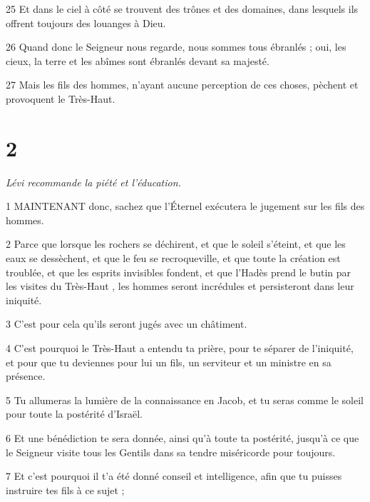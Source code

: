 \par 25 Et dans le ciel à côté se trouvent des trônes et des domaines, dans lesquels ils offrent toujours des louanges à Dieu.

\par 26 Quand donc le Seigneur nous regarde, nous sommes tous ébranlés ; oui, les cieux, la terre et les abîmes sont ébranlés devant sa majesté.

\par 27 Mais les fils des hommes, n'ayant aucune perception de ces choses, pèchent et provoquent le Très-Haut.

\chapter{2}

\par \textit{Lévi recommande la piété et l'éducation.}

\par 1 MAINTENANT donc, sachez que l'Éternel exécutera le jugement sur les fils des hommes.

\par 2 Parce que lorsque les rochers se déchirent, et que le soleil s'éteint, et que les eaux se dessèchent, et que le feu se recroqueville, et que toute la création est troublée, et que les esprits invisibles fondent, et que l'Hadès prend le butin par les visites du Très-Haut , les hommes seront incrédules et persisteront dans leur iniquité.

\par 3 C'est pour cela qu'ils seront jugés avec un châtiment.

\par 4 C'est pourquoi le Très-Haut a entendu ta prière, pour te séparer de l'iniquité, et pour que tu deviennes pour lui un fils, un serviteur et un ministre en sa présence.

\par 5 Tu allumeras la lumière de la connaissance en Jacob, et tu seras comme le soleil pour toute la postérité d'Israël.

\par 6 Et une bénédiction te sera donnée, ainsi qu'à toute ta postérité, jusqu'à ce que le Seigneur visite tous les Gentils dans sa tendre miséricorde pour toujours.

\par 7 Et c'est pourquoi il t'a été donné conseil et intelligence, afin que tu puisses instruire tes fils à ce sujet ;

